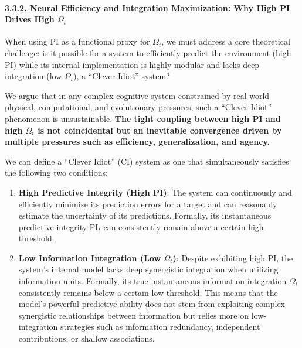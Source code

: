 \documentclass[
  a4paper]{article}
\providecommand{\tightlist}{%
  \setlength{\itemsep}{0pt}\setlength{\parskip}{0pt}}
\begin{document}
\paragraph{\texorpdfstring{3.3.2. Neural Efficiency and Integration
Maximization: Why High PI Drives High
\(\Omega_t\)}{3.3.2. Neural Efficiency and Integration Maximization: Why High PI Drives High \textbackslash Omega\_t}}\label{neural-efficiency-and-integration-maximization-why-high-pi-drives-high-omega_t}

When using PI as a functional proxy for \(\Omega_t\), we must address a
core theoretical challenge: is it possible for a system to efficiently
predict the environment (high PI) while its internal implementation is
highly modular and lacks deep integration (low \(\Omega_t\)), a ``Clever
Idiot'' system?

We argue that in any complex cognitive system constrained by real-world
physical, computational, and evolutionary pressures, such a ``Clever
Idiot'' phenomenon is unsustainable. \textbf{The tight coupling between
high PI and high \(\Omega_t\) is not coincidental but an inevitable
convergence driven by multiple pressures such as efficiency,
generalization, and agency.}

We can define a ``Clever Idiot'' (CI) system as one that simultaneously
satisfies the following two conditions:

\begin{enumerate}
\def\labelenumi{\arabic{enumi}.}
\tightlist
\item
  \textbf{High Predictive Integrity (High PI)}: The system can
  continuously and efficiently minimize its prediction errors for a
  target and can reasonably estimate the uncertainty of its predictions.
  Formally, its instantaneous predictive integrity \(\text{PI}_t\) can
  consistently remain above a certain high threshold.
\item
  \textbf{Low Information Integration (Low \(\Omega_t\))}: Despite
  exhibiting high PI, the system's internal model lacks deep synergistic
  integration when utilizing information units. Formally, its true
  instantaneous information integration \(\Omega_t\) consistently
  remains below a certain low threshold. This means that the model's
  powerful predictive ability does not stem from exploiting complex
  synergistic relationships between information but relies more on
  low-integration strategies such as information redundancy, independent
  contributions, or shallow associations.
\end{enumerate}
\end{document}
